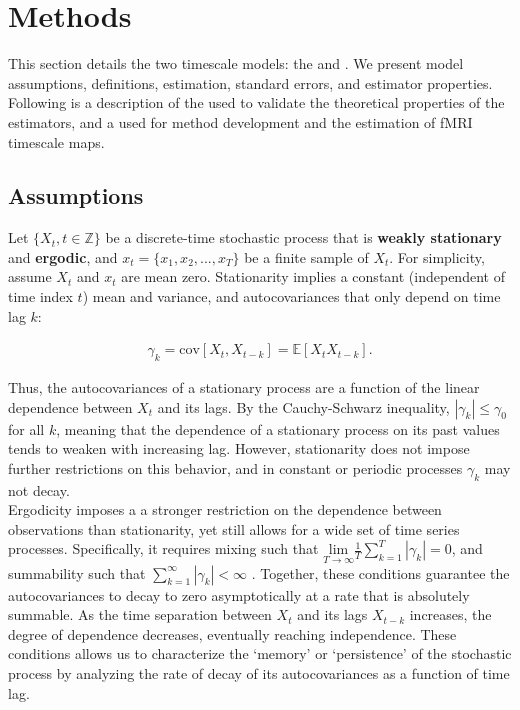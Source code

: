 \documentclass[main.tex]{subfiles}
\begin{document}
\section{Methods}

This section details the two timescale models: the  and . We present model assumptions, definitions, estimation, standard errors, and estimator properties. Following is a description of the  used to validate the theoretical properties of the estimators, and a  used for method development and the estimation of fMRI timescale maps.

\subsection{Assumptions}

Let $\{X_t, t\in \mathbb{Z}\}$ be a discrete-time stochastic process that is \textbf{weakly stationary} and \textbf{ergodic}, and $x_t = \{x_1, x_2, ..., x_T\}$ be a finite sample of $X_t$. For simplicity, assume $X_t$ and $x_t$ are mean zero. Stationarity implies a constant (independent of time index $t$) mean and variance, and autocovariances that only depend on time lag $k$:

\begin{align*} 
    \gamma_k = \text{cov}[X_t, X_{t-k}] = \mathbb{E}[X_t X_{t-k}].
\end{align*}

\noindent Thus, the autocovariances of a stationary process are a function of the linear dependence between $X_t$ and its lags. By the Cauchy-Schwarz inequality, $|\gamma_k|\le \gamma_0$ for all $k$, meaning that the dependence of a stationary process on its past values tends to weaken with increasing lag. However, stationarity does not impose further restrictions on this behavior, and in constant or periodic processes $\gamma_k$ may not decay.\\

Ergodicity imposes a a stronger restriction on the dependence between observations than stationarity, yet still allows for a wide set of time series processes. Specifically, it requires mixing such that $\underset{T\to\infty}{\text{lim}} \frac{1}{T} \sum_{k=1}^T |\gamma_k| = 0$, and summability such that $\sum_{k=1}^\infty |\gamma_k| < \infty$ \citep[chapter~14.7]{hansen_econometrics_2022}. Together, these conditions guarantee the autocovariances to decay to zero asymptotically at a rate that is absolutely summable. As the time separation between $X_t$ and its lags $X_{t-k}$ increases, the degree of dependence decreases, eventually reaching independence. These conditions allows us to characterize the `memory' or `persistence' of the stochastic process by analyzing the rate of decay of its autocovariances as a function of time lag.\\
\end{document}
